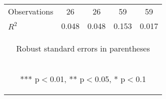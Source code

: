 \begin{center}
\begin{tabular}{lcccc}
Observations & 26 & 26 & 59 & 59 \\
 $R^2$ & 0.048 & 0.048 & 0.153 & 0.017 \\ \hline
\multicolumn{5}{c}{\begin{footnotesize} Robust standard errors in parentheses\end{footnotesize}} \\
\multicolumn{5}{c}{\begin{footnotesize} *** p$<$0.01, ** p$<$0.05, * p$<$0.1\end{footnotesize}} \\
\end{tabular}
\end{center}
